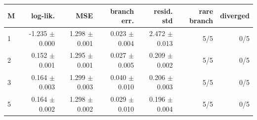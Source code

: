 \begin{tabular}{lrrrrrr}
\toprule
M & log-lik. & MSE & branch err. & resid. std & rare branch & diverged \\
\midrule
1 & -1.235 $\pm$ 0.000 & 1.298 $\pm$ 0.001 & 0.023 $\pm$ 0.004 & 2.472 $\pm$ 0.013 & 5/5 & 0/5 \\
2 & 0.152 $\pm$ 0.001 & 1.295 $\pm$ 0.001 & 0.027 $\pm$ 0.005 & 0.209 $\pm$ 0.002 & 5/5 & 0/5 \\
3 & 0.164 $\pm$ 0.003 & 1.299 $\pm$ 0.003 & 0.040 $\pm$ 0.010 & 0.206 $\pm$ 0.003 & 5/5 & 0/5 \\
5 & 0.164 $\pm$ 0.002 & 1.298 $\pm$ 0.002 & 0.029 $\pm$ 0.010 & 0.196 $\pm$ 0.004 & 5/5 & 0/5 \\
\bottomrule
\end{tabular}
